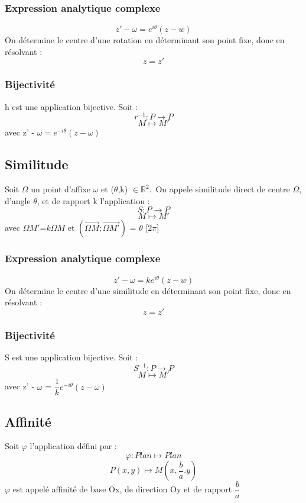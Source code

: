 \subsubsection{Expression analytique complexe}
$$z' - \omega = e^{i\theta}(z-w)$$
On détermine le centre d'une rotation en déterminant son point fixe, donc en résolvant :
$$z = z'$$
\subsubsection{Bijectivité}
h est une application bijective. Soit :
$$r^{-1} : P \rightarrow P$$
$$M \mapsto M'$$
avec z' - $\omega = e^{-i\theta}(z - \omega)$
\subsection{Similitude}
\begin{de}
Soit $\Omega$ un point d'affixe $\omega$ et ($\theta$,k) $\in \mathbb{R}^2$.\
On appele similitude direct de centre $\Omega$, d'angle $\theta$, et de rapport k l'application :
$$S : P \rightarrow P$$
$$ M \mapsto M'$$
avec $\Omega M'$=$k\Omega M$ et $(\overrightarrow{\Omega M};\overrightarrow{\Omega M'})$ = $\theta$ [$2\pi$]
\end{de}
\subsubsection{Expression analytique complexe}
$$z' - \omega  = ke^{i\theta}(z-w)$$
On détermine le centre d'une similitude en déterminant son point fixe, donc en résolvant :
$$z = z'$$
\subsubsection{Bijectivité}
S est une application bijective. Soit :
$$S^{-1} : P \rightarrow P$$
$$M \mapsto M'$$
avec z' - $\omega$ = $\dfrac{1}{k}e^{-i\theta}(z - \omega)$
\subsection{Affinité}
Soit $\varphi$ l'application défini par : 
$$\varphi : Plan \mapsto Plan$$
$$P(x,y) \mapsto M (x,\dfrac{b}{a}.y)$$
$\varphi$ est appelé affinité de base Ox, de direction Oy et de rapport $\dfrac{b}{a}$
